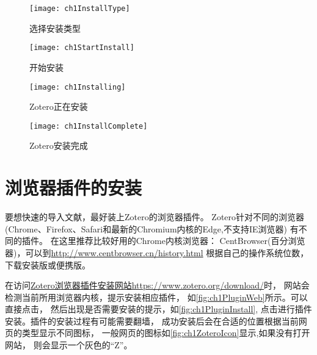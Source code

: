 \documentclass[cn,11pt,chinese]{elegantbook}
\begin{document}
				\begin{figure}[htbp]
					\centering
					\begin{minipage}[t]{\dimexpr0.5\textwidth-4em}
						\centering
						\texttt{[image: ch1InstallType]}
						\caption{选择安装类型}
						\label{fig:installType}
					\end{minipage}
					\hspace{1cm}
					\centering	
					\begin{minipage}[t]{\dimexpr0.5\textwidth-4em}
						\centering
						\texttt{[image: ch1StartInstall]}
						\caption{开始安装}
						\label{fig:ch1StartInstall}
					\end{minipage}
					
				\end{figure}	
			
				
				\begin{figure}[htbp]
					\noindent
					\centering
					\begin{minipage}[t]{\dimexpr0.5\textwidth-4em}
						\centering
						\texttt{[image: ch1Installing]}
						\caption{Zotero正在安装}
						\label{fig:ch1Installing}
					\end{minipage}
					\hspace{1cm}	
					\noindent
					\begin{minipage}[t]{\dimexpr0.5\textwidth-4em}
						\centering
						\texttt{[image: ch1InstallComplete]}
						\caption{Zotero安装完成}
						\label{fig:ch1InstallComplete}	
					\end{minipage}
				\end{figure}	
				
			
	\section{浏览器插件的安装} 
		要想快速的导入文献，最好装上Zotero的浏览器插件。
		Zotero针对不同的浏览器(Chrome、Firefox、Safari和最新的Chromium内核的Edge,不支持IE浏览器)
		有不同的插件。	在这里推荐比较好用的Chrome内核浏览器：
		CentBrowser(百分浏览器)，可以到\url{http://www.centbrowser.cn/history.html}
		根据自己的操作系统位数，下载安装版或便携版。
		
		在访问\href{https://www.zotero.org/download/}
		{Zotero浏览器插件安装网站https://www.zotero.org/download/}时，
		网站会检测当前所用浏览器内核，提示安装相应插件，
		如\autoref{fig:ch1PluginWeb}所示。可以直接点击，
		然后出现是否需要安装的提示，如\autoref{fig:ch1PluginInstall},
		点击进行插件安装。插件的安装过程有可能需要翻墙，
		成功安装后会在合适的位置根据当前网页的类型显示不同图标，
		一般网页的图标如\autoref{fig:ch1ZoteroIcon}显示,如果没有打开网站，
		则会显示一个灰色的“Z”。
		
\end{document}
